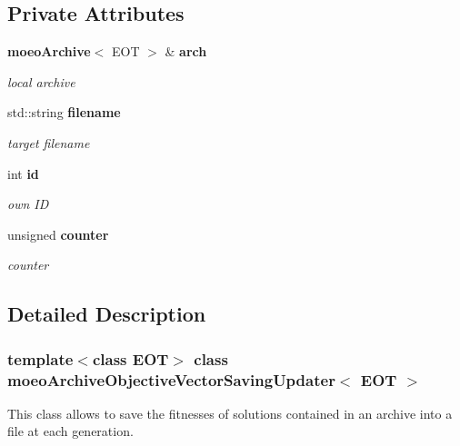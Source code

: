 \subsection*{Private Attributes}
\begin{CompactItemize}
\item 
{\bf moeo\-Archive}$<$ EOT $>$ \& {\bf arch}\label{classmoeoArchiveObjectiveVectorSavingUpdater_7088ba68c9be8b1fdea9965deea77a68}

\begin{CompactList}\small\item\em local archive \item\end{CompactList}\item 
std::string {\bf filename}\label{classmoeoArchiveObjectiveVectorSavingUpdater_47ddf5e512baa915f79fdd934251d85b}

\begin{CompactList}\small\item\em target filename \item\end{CompactList}\item 
int {\bf id}\label{classmoeoArchiveObjectiveVectorSavingUpdater_8b5c7d9123d368503708949fa2998597}

\begin{CompactList}\small\item\em own ID \item\end{CompactList}\item 
unsigned {\bf counter}\label{classmoeoArchiveObjectiveVectorSavingUpdater_7a72b82ba35789d1b6330bad17ef6cff}

\begin{CompactList}\small\item\em counter \item\end{CompactList}\end{CompactItemize}


\subsection{Detailed Description}
\subsubsection*{template$<$class EOT$>$ class moeo\-Archive\-Objective\-Vector\-Saving\-Updater$<$ EOT $>$}

This class allows to save the fitnesses of solutions contained in an archive into a file at each generation. 



